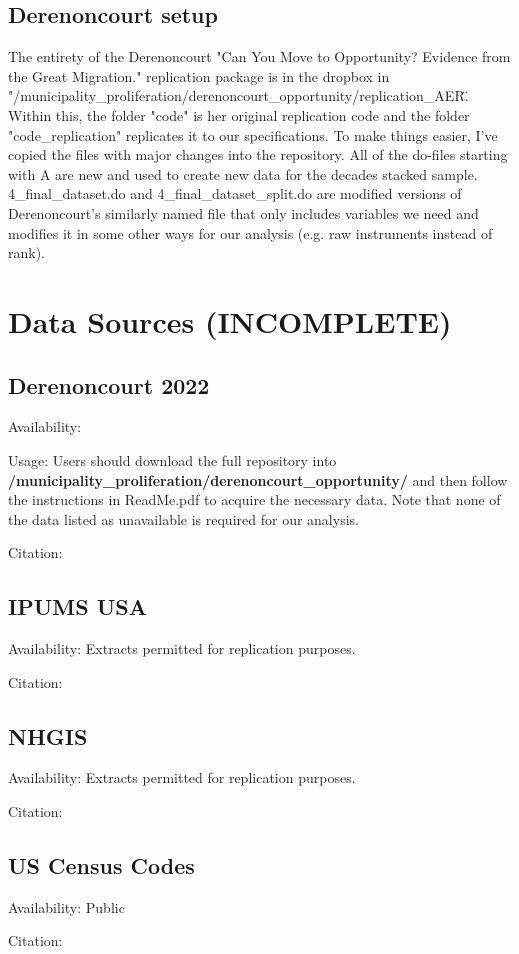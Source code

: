 \documentclass{article}
\begin{document}
\subsection{Derenoncourt setup}
The entirety of the Derenoncourt "Can You Move to Opportunity? Evidence from the Great Migration." replication package is in the dropbox in "/municipality\_proliferation/derenoncourt\_opportunity/replication\_AER\". Within this, the folder "code" is her original replication code and the folder "code\_replication" replicates it to our specifications. To make things easier, I've copied the files with major changes into the repository. All of the do-files starting with A are new and used to create new data for the decades stacked sample. 4\_final\_dataset.do and 4\_final\_dataset\_split.do are modified versions of Derenoncourt's similarly named file that only includes variables we need and modifies it in some other ways for our analysis (e.g. raw instruments instead of rank).

\section{Data Sources (INCOMPLETE)}
\subsection{Derenoncourt 2022}
Availability:

Usage: Users should download the full repository into \textbf{/municipality\_proliferation/derenoncourt\_opportunity/} and then follow the instructions in ReadMe.pdf to acquire the necessary data. Note that none of the data listed as unavailable is required for our analysis.

Citation: 

\subsection{IPUMS USA}
Availability: Extracts permitted for replication purposes.

Citation: 

\subsection{NHGIS}
Availability: Extracts permitted for replication purposes.

Citation: 

\subsection{US Census Codes}
Availability: Public

Citation: 






\end{document}
